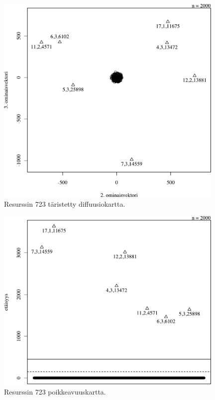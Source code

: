 \begin{figure}[p]
\centering
\includegraphics[width=11cm]{pics/diffuusiokuvat/service_723.pdf}
\caption{Resurssin 723 täristetty diffuusiokartta.}
\label{diffusio_723}
\end{figure}

\begin{figure}[p]
\centering
\includegraphics[width=11cm]{pics/tiheyskuvat/service_723.pdf}
\caption{Resurssin 723 poikkeavuuskartta.}
\label{service_723}
\end{figure}


